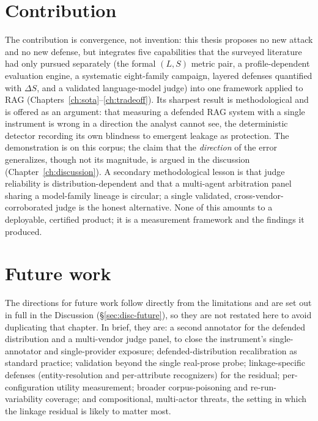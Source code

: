 \documentclass[12pt,a4paper]{report}
\begin{document}
\section{Contribution}
\label{sec:concl-contribution}

The contribution is convergence, not invention: this thesis proposes no new attack and no new
defense, but integrates five capabilities that the surveyed literature had only pursued
separately (the formal $(L,S)$ metric pair, a profile-dependent evaluation engine, a
systematic eight-family campaign, layered defenses quantified with $\Delta S$, and a validated
language-model judge) into one framework applied to RAG (Chapters~\ref{ch:sota}--\ref{ch:tradeoff}).
Its sharpest result is methodological and is offered as an argument: that measuring a defended
RAG system with a single instrument is wrong in a direction the analyst cannot see, the
deterministic detector recording its own blindness to emergent leakage as protection. The
demonstration is on this corpus; the claim that the \emph{direction} of the error generalizes,
though not its magnitude, is argued in the discussion (Chapter~\ref{ch:discussion}). A
secondary methodological lesson is that judge reliability is distribution-dependent and that a
multi-agent arbitration panel sharing a model-family lineage is circular; a single validated,
cross-vendor-corroborated judge is the honest alternative. None of this amounts to a deployable,
certified product; it is a measurement framework and the findings it produced.

\section{Future work}
\label{sec:concl-future}

The directions for future work follow directly from the limitations and are set out in full in the
Discussion (\S\ref{sec:disc-future}), so they are not restated here to avoid duplicating that chapter.
In brief, they are: a second annotator for the defended distribution and a multi-vendor judge panel,
to close the instrument's single-annotator and single-provider exposure; defended-distribution
recalibration as standard practice; validation beyond the single real-prose probe; linkage-specific
defenses (entity-resolution and per-attribute recognizers) for the residual; per-configuration utility
measurement; broader corpus-poisoning and re-run-variability coverage; and compositional, multi-actor
threats, the setting in which the linkage residual is likely to matter most.
\end{document}
